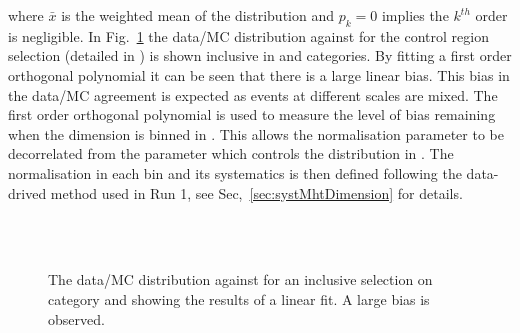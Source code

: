 where $\bar{x}$ is the weighted mean of the distribution and $p_k = 0$ 
implies the $k^{th}$ order is negligible.
In Fig.~\ref{fig:linearMotiv} the data/MC 
distribution against \mht for the control region selection 
(detailed in \cite{CMS_AN_2013-366}) is shown inclusive 
in \scalht and categories. By fitting a first order
orthogonal polynomial it can be seen that there is a large linear bias. 
This bias in the data/MC agreement is expected as events 
at different scales are mixed.
The first order orthogonal polynomial
is used to measure the level of bias remaining 
when the \mht dimension is binned in \scalht.
This allows the normalisation parameter to be
decorrelated from the parameter which controls
the distribution in \mht.
The normalisation in each \scalht bin and its systematics 
is then defined following the data-drived method used in Run 1, see Sec,~\ref{sec:systMhtDimension} for details.
\begin{figure}[h!]
  \centering
  ~~
  \\
  ~~
  \\
  \caption{\label{fig:linearMotiv} 
  The data/MC distribution against \mht for an inclusive selection on category and \scalht
  showing the results of a linear fit. A large bias is observed. 
 }
\end{figure}

